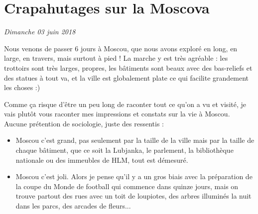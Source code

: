 \hypertarget{crapahutages-sur-la-moscova}{%
\section{Crapahutages sur la
Moscova}\label{crapahutages-sur-la-moscova}}

\emph{Dimanche 03 juin 2018}

Nous venons de passer 6 jours à Moscou, que nous avons exploré en long,
en large, en travers, mais surtout à pied ! La marche y est très
agréable : les trottoirs sont très larges, propres, les bâtiments sont
beaux avec des bas-reliefs et des statues à tout va, et la ville est
globalement plate ce qui facilite grandement les choses :)

Comme ça risque d'être un peu long de raconter tout ce qu'on a vu et
visité, je vais plutôt vous raconter mes impressions et constats sur la
vie à Moscou. Aucune prétention de sociologie, juste des ressentis :

\begin{itemize}
\tightlist
\item
  Moscou c'est grand, pas seulement par la taille de la ville mais par
  la taille de chaque bâtiment, que ce soit la Lubjanka, le parlement,
  la bibliothèque nationale ou des immeubles de HLM, tout est démesuré.
\item
  Moscou c'est joli. Alors je pense qu'il y a un gros biais avec la
  préparation de la coupe du Monde de football qui commence dans quinze
  jours, mais on trouve partout des rues avec un toit de loupiotes, des
  arbres illuminés la nuit dans les parcs, des arcades de fleurs...
\end{itemize}

